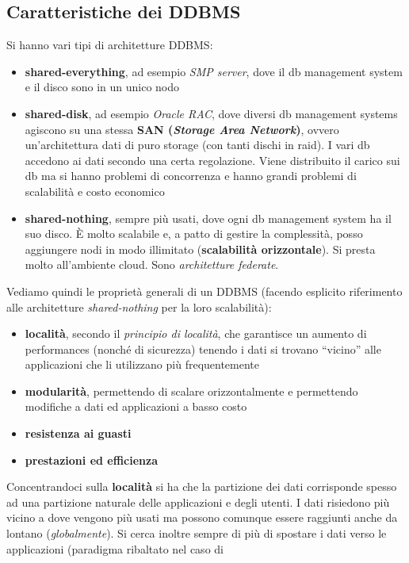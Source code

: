 \documentclass[a4paper,12pt, oneside]{book}
\begin{document}
\subsection{Caratteristiche dei DDBMS}
Si hanno vari tipi di architetture DDBMS:
\begin{itemize}
  \item \textbf{shared-everything}, ad esempio \textit{SMP server}, dove il db
  management system e il disco sono in un unico nodo
  \item \textbf{shared-disk}, ad esempio \textit{Oracle RAC}, dove diversi db
  management systems 
  agiscono su una stessa \textbf{SAN (\textit{Storage Area Network})}, ovvero
  un'architettura dati di puro storage (con tanti dischi in raid). I vari db
  accedono ai dati secondo una certa regolazione. Viene distribuito il carico
  sui db ma si hanno problemi di concorrenza e hanno grandi problemi di
  scalabilità e costo economico
  \item \textbf{shared-nothing}, sempre più usati, dove ogni db management
  system ha il suo disco. È molto scalabile e, a patto di gestire la
  complessità, posso aggiungere nodi in modo illimitato (\textbf{scalabilità
    orizzontale}). Si presta molto all'ambiente cloud. Sono \textit{architetture
  federate}.
\end{itemize}
Vediamo quindi le proprietà generali di un DDBMS (facendo esplicito riferimento
alle architetture \textit{shared-nothing} per la loro scalabilità):
\begin{itemize}
  \item \textbf{località}, secondo il \textit{principio di località}, che
  garantisce un aumento di performances (nonché di sicurezza) tenendo i dati si
  trovano ``vicino'' 
  alle applicazioni che li utilizzano più frequentemente 
  \item \textbf{modularità}, permettendo di scalare orizzontalmente e
  permettendo modifiche a dati ed applicazioni a basso costo
  \item \textbf{resistenza ai guasti}
  \item \textbf{prestazioni ed efficienza}
\end{itemize}
Concentrandoci sulla \textbf{località} si ha che la partizione dei dati
corrisponde spesso ad una partizione naturale delle applicazioni e degli utenti.
I dati risiedono più vicino a dove vengono più usati ma possono comunque essere
raggiunti anche da lontano (\textit{globalmente}). Si cerca inoltre sempre di
più di spostare i dati verso le applicazioni (paradigma ribaltato nel caso di
\end{document}
